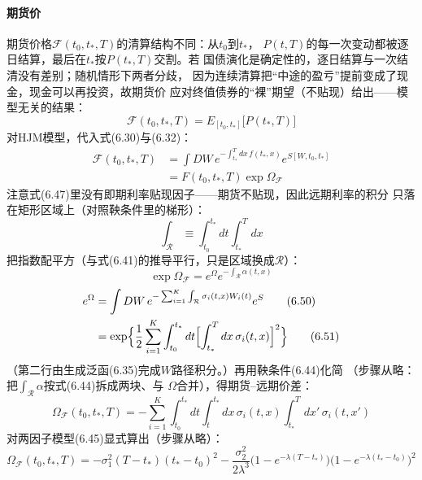 \paragraph{期货价}
期货价格$\mathcal{F}(t_0,t_*,T)$的清算结构不同：从$t_0$到$t_*$，
$P(t,T)$的每一次变动都被逐日结算，最后在$t_*$按$P(t_*,T)$交割。若
国债演化是确定性的，逐日结算与一次结清没有差别；随机情形下两者分歧，
因为连续清算把“中途的盈亏”提前变成了现金，现金可以再投资，故期货价
应对终值债券的“裸”期望（不贴现）给出——模型无关的结果：
\begin{equation*}
\mathcal{F}(t_0,t_*,T)=E_{[t_0,t_*]}\bigl[P(t_*,T)\bigr]
\tag{6.46}
\end{equation*}
对HJM模型，代入式(6.30)与(6.32)：
\begin{align*}
\mathcal{F}(t_0,t_*,T)&=\int DW\,e^{-\int_{t_*}^{T}dx\,f(t_*,x)}
e^{S[W,t_0,t_*]}
\tag{6.47}\\
&=F(t_0,t_*,T)\exp\Omega_{\mathcal{F}}
\tag{6.48}
\end{align*}
注意式(6.47)里没有即期利率贴现因子——期货不贴现，因此远期利率的积分
只落在矩形区域上（对照鞅条件里的梯形）：
\begin{equation*}
\int_{\mathcal{R}}\equiv\int_{t_0}^{t_*}dt\int_{t_*}^{T}dx
\end{equation*}
把指数配平方（与式(6.41)的推导平行，只是区域换成$\mathcal{R}$）：
\begin{equation*}
\exp\Omega_{\mathcal{F}}=e^{\Omega}e^{-\int_{\mathcal{R}}\alpha(t,x)}
\tag{6.49}
\end{equation*}
\begin{align*}
e^{\Omega}&=\int DW\,e^{-\sum_{i=1}^{K}\int_{\mathcal{R}}
\sigma_i(t,x)W_i(t)}e^{S}
\tag{6.50}\\
&=\exp\Bigl\{\frac{1}{2}\sum_{i=1}^{K}\int_{t_0}^{t_*}dt
\Bigl[\int_{t_*}^{T}dx\,\sigma_i(t,x)\Bigr]^2\Bigr\}
\tag{6.51}
\end{align*}
（第二行由生成泛函(6.35)完成$W$路径积分。）再用鞅条件(6.44)化简
（步骤从略：把$\int_{\mathcal{R}}\alpha$按式(6.44)拆成两块、与
$\Omega$合并），得期货--远期价差：
\begin{equation*}
\Omega_{\mathcal{F}}(t_0,t_*,T)
=-\sum_{i=1}^{K}\int_{t_0}^{t_*}dt\int_{t}^{t_*}dx\,\sigma_i(t,x)
\int_{t_*}^{T}dx'\,\sigma_i(t,x')
\tag{6.52}
\end{equation*}
对两因子模型(6.45)显式算出（步骤从略）：
\begin{equation*}
\Omega_{\mathcal{F}}(t_0,t_*,T)
=-\sigma_1^2(T-t_*)(t_*-t_0)^2
-\frac{\sigma_2^2}{2\lambda^3}
\bigl(1-e^{-\lambda(T-t_*)}\bigr)
\bigl(1-e^{-\lambda(t_*-t_0)}\bigr)^2
\end{equation*}

